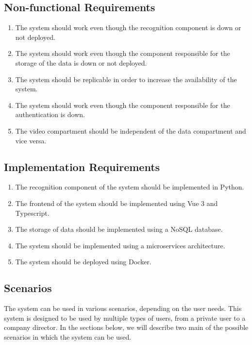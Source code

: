 \documentclass{scrartcl}
\begin{document}
    \subsection{Non-functional Requirements}\label{subsec:non-functional-requirements}
    \begin{enumerate}
        \item \label{itm:func-1} The system should work even though the recognition component is down or not deployed.
        \item \label{itm:func-2} The system should work even though the component responsible for the storage of the data is down or not deployed.
        \item \label{itm:func-3} The system should be replicable in order to increase the availability of the system.
        \item \label{itm:func-4} The system should work even though the component responsible for the authentication is down.
        \item \label{itm:func-5} The video compartment should be independent of the data compartment and vice versa.
    \end{enumerate}

    \subsection{Implementation Requirements}\label{subsec:implementation-requirements}
    \begin{enumerate}
        \item \label{itm:impl-1} The recognition component of the system should be implemented in Python.
        \item \label{itm:impl-2} The frontend of the system should be implemented using Vue 3 and Typescript.
        \item \label{itm:impl-3} The storage of data should be implemented using a NoSQL database.
        \item \label{itm:impl-4} The system should be implemented using a microservices architecture.
        \item \label{itm:impl-5} The system should be deployed using Docker.
    \end{enumerate}

    \subsection{Scenarios}
    The system can be used in various scenarios, depending on the user needs.
    This system is designed to be used by multiple types of users, from a private user to a company director.
    In the sections below, we will describe two main of the possible scenarios in which the system can be used.
\end{document}
